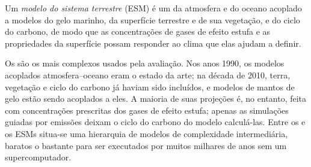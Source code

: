 \begin{omfigure}
\par{}\label{fig:b3:climate-models:grid}
\end{omfigure}

\begin{definition}\label{def:b3:climate-models:esm}
Um \emph{modelo do sistema terrestre} (ESM) é um 
da atmosfera e do oceano acoplado a modelos do
gelo marinho, da superfície terrestre e de sua vegetação, e do ciclo do carbono, de modo
que as concentrações de gases de efeito estufa e as propriedades da
superfície possam responder ao clima que elas ajudam a definir.
\end{definition}

Os  são os mais complexos usados pela avaliação. Nos
anos 1990, os modelos acoplados atmosfera--oceano eram o estado da arte;
na década de 2010, terra, vegetação e ciclo do carbono já haviam sido incluídos, e
modelos de mantos de gelo estão sendo acoplados a eles. A maioria de suas projeções é,
no entanto, feita com concentrações prescritas dos gases de efeito estufa;
apenas as simulações guiadas por emissões deixam o ciclo do carbono do modelo calculá-las.
Entre os  e os ESMs situa-se uma hierarquia de modelos
de complexidade intermediária, baratos o bastante para ser executados por muitos milhares de
anos sem um supercomputador.


